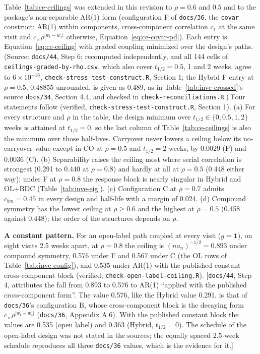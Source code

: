 \documentclass[11pt]{article}
\newcommand{\note}[1]{\textcolor{blue!60!black}{\small [#1]}}
\newcommand{\code}[1]{\texttt{#1}}
\begin{document}
Table~\ref{tab:ce-ceilings} was extended in this revision to
$\rho = 0.6$ and $0.5$ and to the package's non-separable AR(1) form
(configuration F of \code{docs/36}, the \code{covar} construct: AR(1)
within components, cross-component correlation $c_1$ at the same visit
and $c_\times\rho^{|w_t - w_s|}$ otherwise,
Equation~\eqref{eq:ce-covar-pd}). Each entry is
Equation~\eqref{eq:ce-ceiling} with graded coupling minimized over the
design's paths. (Source: \code{docs/44}, Step 6; recomputed
independently, and all 144 cells of \code{ceilings-graded-by-rho.csv},
which also cover $t_{1/2} = 0.5$, 1 and 2 weeks, agree to
$6 \times 10^{-16}$, \code{check-stress-test-construct.R}, Section 1;
the Hybrid F entry at $\rho = 0.5$, 0.48855 unrounded, is given as
0.489, as in Table~\ref{tab:inve-crossed}'s source \code{docs/34},
Section 4.4, and checked in \code{check-reconciliations.R}.) Four statements
follow (verified, \code{check-stress-test-construct.R}, Section 1). (a) For every
structure and $\rho$ in the table, the design minimum over
$t_{1/2} \in \{0, 0.5, 1, 2\}$ weeks is attained at $t_{1/2} = 0$, so
the last column of Table~\ref{tab:ce-ceilings} is also the minimum over
those half-lives. Carryover never lowers a ceiling below its
no-carryover value except in CO at $\rho = 0.5$ and $t_{1/2} = 2$
weeks, by 0.0029 (F) and 0.0036 (C). (b) Separability raises the
ceiling most where serial correlation is strongest (0.291 to 0.440 at
$\rho = 0.8$) and hardly at all at $\rho = 0.5$ (0.448 either way);
under F at $\rho = 0.8$ the response block is nearly singular in
Hybrid and OL+BDC (Table~\ref{tab:inve-eig}). (c) Configuration C at
$\rho = 0.7$ admits $c_{bm} = 0.45$ in every design and half-life with
a margin of 0.024. (d) Compound symmetry has the lowest ceiling at
$\rho \ge 0.6$ and the highest at $\rho = 0.5$ (0.458 against 0.448);
the order of the structures depends on $\rho$.

\textbf{A constant pattern.} For an open-label path coupled at every
visit ($g = \mathbf 1$), on eight visits 2.5 weeks apart, at
$\rho = 0.8$ the ceiling is $(n a_n)^{-1/2} = 0.893$ under compound
symmetry, 0.576 under F and 0.567 under C (the OL rows of
Table~\ref{tab:inve-config}), and 0.535 under AR(1) with the published
constant cross-component block (verified, \code{check-open-label-ceiling.R}). \note{\code{docs/44}, Step 4, attributes the
fall from 0.893 to 0.576 to AR(1) ``applied with the published
cross-component form''. The value 0.576, like the Hybrid value 0.291,
is that of \code{docs/36}'s configuration B, whose cross-component
block is the decaying form $c_\times\rho^{|w_t - w_s|}$
(\code{docs/36}, Appendix A.6). With the published constant block the
values are 0.535 (open label) and 0.363 (Hybrid, $t_{1/2} = 0$). The
schedule of the open-label design was not stated in the sources; the
equally spaced 2.5-week schedule reproduces all three \code{docs/36}
values, which is the evidence for it.}
\end{document}
